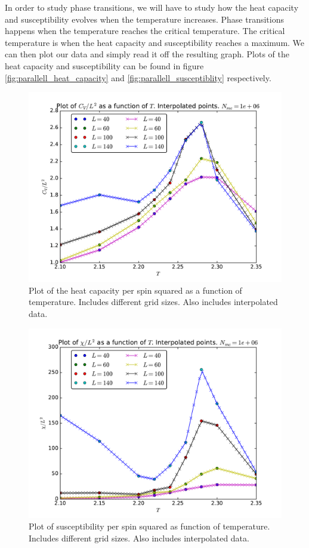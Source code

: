 \documentclass[12pt]{article}
\begin{document}
In order to study phase transitions, we will have to study how the heat capacity and susceptibility evolves when the temperature increases. Phase transitions happens when the temperature reaches the critical temperature. The critical temperature is when the heat capacity and susceptibility reaches a maximum. We can then plot our data and simply read it off the resulting graph. Plots of the heat capacity and susceptibility can be found in figure \ref{fig:parallell_heat_capacity} and \ref{fig:parallell_susceptiblity} respectively.

\begin{figure}[H]
\centering
\includegraphics[width=\linewidth]{Plots/Heat_capacity_parallellization_interpolated.pdf}
\caption{Plot of the heat capacity per spin squared as a function of temperature. Includes different grid sizes. Also includes interpolated data.}
\label{fig:parallell_heat_capacity_interpolated}
\end{figure}

\begin{figure}[H]
\centering
\includegraphics[width=\linewidth]{Plots/Susceptibility_parallellization_interpolated.pdf}
\caption{Plot of susceptibility per spin squared as function of temperature. Includes different grid sizes. Also includes interpolated data.}
\label{fig:parallell_susceptiblity_interpolated}
\end{figure}
\end{document}
